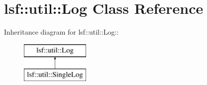 \hypertarget{classlsf_1_1util_1_1Log}{
\section{lsf::util::Log Class Reference}
\label{classlsf_1_1util_1_1Log}
}
Inheritance diagram for lsf::util::Log::\begin{figure}[H]
\begin{center}
\leavevmode
\includegraphics[height=2cm]{classlsf_1_1util_1_1Log}
\end{center}
\end{figure}
